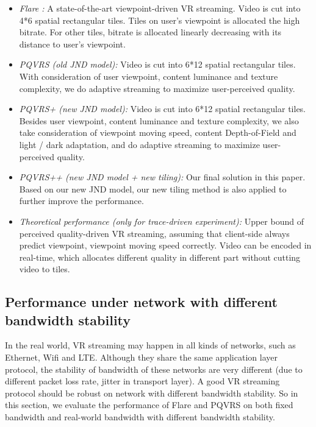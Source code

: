 \begin{itemize}

\item \emph{Flare \cite{Flare}:} A state-of-the-art viewpoint-driven VR streaming. Video is cut into 4*6 spatial rectangular tiles. Tiles on user's viewpoint is allocated the high bitrate. For other tiles, bitrate is allocated linearly decreasing with its distance to user's viewpoint.

\item \emph{PQVRS (old JND model):} Video is cut into 6*12 spatial rectangular tiles. With consideration of user viewpoint, content luminance and texture complexity, we do adaptive streaming to maximize user-perceived quality.

\item \emph{PQVRS+ (new JND model):} Video is cut into 6*12 spatial rectangular tiles. Besides user viewpoint, content luminance and texture complexity, we also take consideration of viewpoint moving speed, content Depth-of-Field and light / dark adaptation, and do adaptive streaming to maximize user-perceived quality.

\item \emph{PQVRS++ (new JND model + new tiling):} Our final solution in this paper. Based on our new JND model, our new tiling method is also applied to further improve the performance.

\item \emph{Theoretical performance (only for trace-driven experiment):} Upper bound of perceived quality-driven VR streaming, assuming that client-side always predict viewpoint, viewpoint moving speed correctly. Video can be encoded in real-time, which allocates different quality in different part without cutting video to tiles.



\end{itemize}

\subsection{Performance under network with different bandwidth stability}

In the real world, VR streaming may happen in all kinds of networks, such as Ethernet, Wifi and LTE. Although they share the same application layer protocol, the stability of bandwidth of these networks are very different (due to different packet loss rate, jitter in transport layer). A good VR streaming protocol should be robust on network with different bandwidth stability. So in this section, we evaluate the performance of Flare and PQVRS on both fixed bandwidth and real-world bandwidth with different bandwidth stability.

